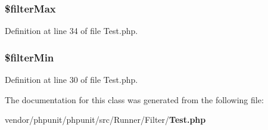\subsubsection[{\$filter\+Max}]{\setlength{\rightskip}{0pt plus 5cm}\$filter\+Max\hspace{0.3cm}{\ttfamily [protected]}}\label{class_p_h_p_unit___runner___filter___test_a6100e27b99e25ee239180e88ddb215e7}


Definition at line 34 of file Test.\+php.

\subsubsection[{\$filter\+Min}]{\setlength{\rightskip}{0pt plus 5cm}\$filter\+Min\hspace{0.3cm}{\ttfamily [protected]}}\label{class_p_h_p_unit___runner___filter___test_aa5ca8169a9cc9ae393c32937f299ef24}


Definition at line 30 of file Test.\+php.



The documentation for this class was generated from the following file\+:\begin{DoxyCompactItemize}
\item 
vendor/phpunit/phpunit/src/\+Runner/\+Filter/{\bf Test.\+php}\end{DoxyCompactItemize}
